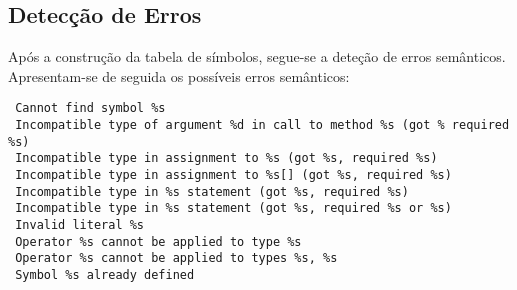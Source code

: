 \documentclass[11pt,a4paper]{article}
\begin{document}
\subsection{Detecção de Erros}

Após a construção da tabela de símbolos, segue-se a deteção de erros semânticos. Apresentam-se de seguida os possíveis erros semânticos:

\begin{lstlisting}
 Cannot find symbol %s
 Incompatible type of argument %d in call to method %s (got % required %s)
 Incompatible type in assignment to %s (got %s, required %s)
 Incompatible type in assignment to %s[] (got %s, required %s)
 Incompatible type in %s statement (got %s, required %s)
 Incompatible type in %s statement (got %s, required %s or %s)
 Invalid literal %s
 Operator %s cannot be applied to type %s
 Operator %s cannot be applied to types %s, %s
 Symbol %s already defined
\end{lstlisting}
\end{document}
